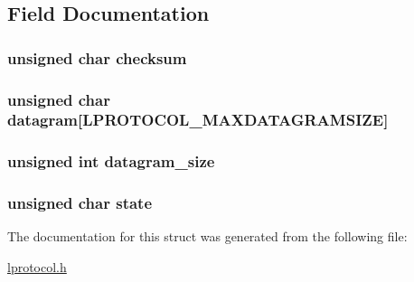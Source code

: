 \subsection{Field Documentation}
\hypertarget{structlprotocoldatagram__t_a876c647471f5dc4279209ebe0ce3ebc5}{
\subsubsection[{checksum}]{\setlength{\rightskip}{0pt plus 5cm}unsigned char {\bf checksum}}}
\label{structlprotocoldatagram__t_a876c647471f5dc4279209ebe0ce3ebc5}
\hypertarget{structlprotocoldatagram__t_ac043096550aa0fa5af46c3e241d24f17}{
\subsubsection[{datagram}]{\setlength{\rightskip}{0pt plus 5cm}unsigned char {\bf datagram}\mbox{[}LPROTOCOL\_\-MAXDATAGRAMSIZE\mbox{]}}}
\label{structlprotocoldatagram__t_ac043096550aa0fa5af46c3e241d24f17}
\hypertarget{structlprotocoldatagram__t_acccd9d4f589b3930c285f2dd4fdeb4bf}{
\subsubsection[{datagram\_\-size}]{\setlength{\rightskip}{0pt plus 5cm}unsigned int {\bf datagram\_\-size}}}
\label{structlprotocoldatagram__t_acccd9d4f589b3930c285f2dd4fdeb4bf}
\hypertarget{structlprotocoldatagram__t_ab12828525693568ae9c217805bea1ef9}{
\subsubsection[{state}]{\setlength{\rightskip}{0pt plus 5cm}unsigned char {\bf state}}}
\label{structlprotocoldatagram__t_ab12828525693568ae9c217805bea1ef9}


The documentation for this struct was generated from the following file:\begin{DoxyCompactItemize}
\item 
\hyperlink{lprotocol_8h}{lprotocol.h}\end{DoxyCompactItemize}
